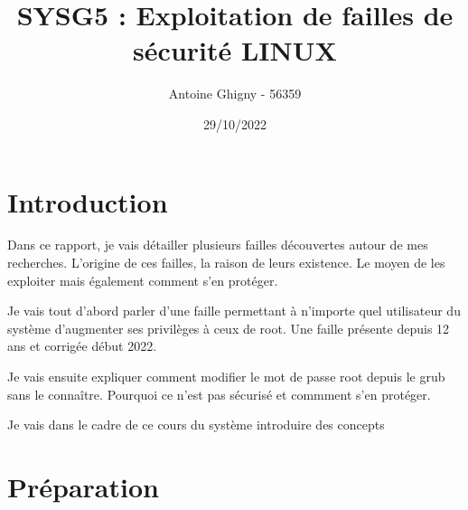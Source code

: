 \documentclass[a4paper, 12pt]{article}
\title{SYSG5 : Exploitation de failles de sécurité LINUX}
\author{Antoine Ghigny - 56359}          \let\Author\@author
\date{29/10/2022}           \let\Date\@date
\begin{document}
\maketitle 

   \tableofcontents

    \newpage
   \section{Introduction}
   \begin{flushleft}
       \noindent Dans ce rapport, je vais détailler plusieurs failles découvertes autour de mes recherches. L'origine de ces failles, la raison de leurs existence. Le moyen de les exploiter mais également comment s'en protéger.
       \item Je vais tout d'abord parler d'une faille permettant à n'importe quel utilisateur du système d'augmenter ses privilèges à ceux de root. Une faille présente depuis 12 ans et corrigée début 2022. 
       \item Je vais ensuite expliquer comment modifier le mot de passe root depuis le grub sans le connaître. Pourquoi ce n'est pas sécurisé et commment s'en protéger. 
       \item Je vais dans le cadre de ce cours du système introduire des concepts
   \end{flushleft}

   \section{Préparation}
\end{document}
